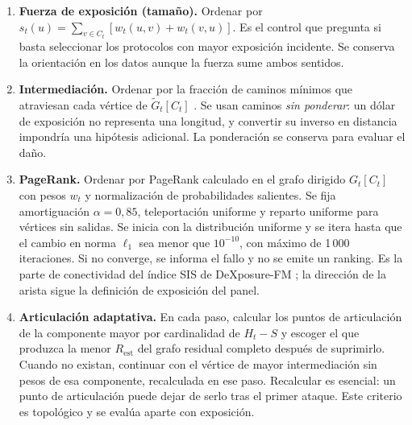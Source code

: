 \documentclass[journal]{IEEEtran}
\begin{document}
\begin{enumerate}
\item \textbf{Fuerza de exposición (tamaño).} Ordenar por
      $s_t(u)=\sum_{v\in C_t}[w_t(u,v)+w_t(v,u)]$. Es el control que pregunta si basta
      seleccionar los protocolos con mayor exposición incidente. Se conserva
      la orientación en los datos aunque la fuerza sume ambos sentidos.

\item \textbf{Intermediación.} Ordenar por la fracción de caminos mínimos que
      atraviesan cada vértice de $\tilde G_t[C_t]$ \cite{freeman1977betweenness}.
      Se usan caminos \emph{sin ponderar}: un dólar de exposición no representa
      una longitud, y convertir su inverso en distancia impondría una hipótesis
      adicional. La ponderación se conserva para evaluar el daño.

\item \textbf{PageRank.} Ordenar por PageRank calculado en el grafo dirigido
      $G_t[C_t]$ con pesos $w_t$ y normalización de probabilidades salientes.
      Se fija amortiguación $\alpha=0{,}85$, teleportación uniforme y reparto
      uniforme para vértices sin salidas. Se inicia con la distribución uniforme
      y se itera hasta que el cambio en norma $\ell_1$ sea menor que $10^{-10}$,
      con máximo de 1\,000 iteraciones. Si no converge, se informa el fallo y
      no se emite un ranking. Es la parte de conectividad del índice
      SIS de DeXposure-FM \cite{shu2026dexposurefm}; la dirección de la arista
      sigue la definición de exposición del panel.

\item \textbf{Articulación adaptativa.} En cada paso, calcular los puntos de
      articulación de la componente mayor por cardinalidad de $H_t-S$ y escoger
      el que produzca la menor $R_{\mathrm{est}}$ del grafo residual completo
      después de suprimirlo. Cuando no existan, continuar con el vértice de
      mayor intermediación sin pesos de esa componente, recalculada en ese paso.
      Recalcular es
      esencial: un punto de articulación puede dejar de serlo tras el primer
      ataque. Este criterio es topológico y se evalúa aparte con exposición.


\end{enumerate}
\end{document}
